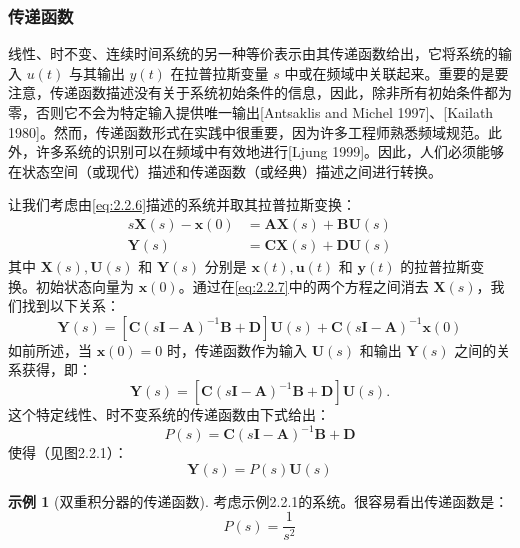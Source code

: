 \documentclass[UTF8,12pt,a4paper]{ctexart}
\theoremstyle{definition}
\newtheorem{example}{示例}[section]
\begin{document}
\subsubsection{传递函数}

线性、时不变、连续时间系统的另一种等价表示由其传递函数给出，它将系统的输入 $u(t)$ 与其输出 $y(t)$ 在拉普拉斯变量 $s$ 中或在频域中关联起来。重要的是要注意，传递函数描述没有关于系统初始条件的信息，因此，除非所有初始条件都为零，否则它不会为特定输入提供唯一输出[Antsaklis and Michel 1997]、[Kailath 1980]。然而，传递函数形式在实践中很重要，因为许多工程师熟悉频域规范。此外，许多系统的识别可以在频域中有效地进行[Ljung 1999]。因此，人们必须能够在状态空间（或现代）描述和传递函数（或经典）描述之间进行转换。

让我们考虑由\eqref{eq:2.2.6}描述的系统并取其拉普拉斯变换：
\begin{equation}\label{eq:2.2.7}
\begin{aligned}
s\mathbf{X}(s) - \mathbf{x}(0) &= \mathbf{A}\mathbf{X}(s) + \mathbf{B}\mathbf{U}(s) \\
\mathbf{Y}(s) &= \mathbf{C}\mathbf{X}(s) + \mathbf{D}\mathbf{U}(s)
\end{aligned}
\end{equation}
其中 $\mathbf{X}(s), \mathbf{U}(s)$ 和 $\mathbf{Y}(s)$ 分别是 $\mathbf{x}(t), \mathbf{u}(t)$ 和 $\mathbf{y}(t)$ 的拉普拉斯变换。初始状态向量为 $\mathbf{x}(0)$。通过在\eqref{eq:2.2.7}中的两个方程之间消去 $\mathbf{X}(s)$，我们找到以下关系：
\begin{equation}\label{eq:2.2.8}
\mathbf{Y}(s) = [\mathbf{C}(s\mathbf{I}-\mathbf{A})^{-1}\mathbf{B} + \mathbf{D}]\mathbf{U}(s) + \mathbf{C}(s\mathbf{I}-\mathbf{A})^{-1}\mathbf{x}(0)
\end{equation}
如前所述，当 $\mathbf{x}(0)=0$ 时，传递函数作为输入 $\mathbf{U}(s)$ 和输出 $\mathbf{Y}(s)$ 之间的关系获得，即：
\begin{equation}\label{eq:2.2.9}
\mathbf{Y}(s) = [\mathbf{C}(s\mathbf{I}-\mathbf{A})^{-1}\mathbf{B} + \mathbf{D}]\mathbf{U}(s).
\end{equation}
这个特定线性、时不变系统的传递函数由下式给出：
\begin{equation}\label{eq:2.2.10}
P(s) = \mathbf{C}(s\mathbf{I}-\mathbf{A})^{-1}\mathbf{B} + \mathbf{D}
\end{equation}
使得（见图2.2.1）：
\begin{equation}\label{eq:2.2.11}
\mathbf{Y}(s) = P(s)\mathbf{U}(s)
\end{equation}

\begin{example}[双重积分器的传递函数]
考虑示例2.2.1的系统。很容易看出传递函数是：
\[
P(s) = \frac{1}{s^2}
\]
\end{example}
\end{document}
